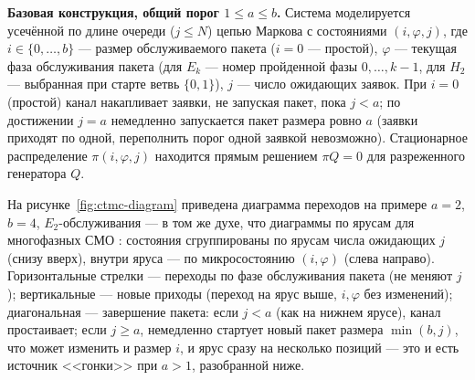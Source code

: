 \documentclass[12pt,a4paper]{article}
\newcommand{\articlesection}[1]{\par\vspace{14pt}{\bfseries #1}\par\vspace{6pt}\nopagebreak}
\begin{document}
\articlesection{Метод}

\noindent\textbf{Базовая конструкция, общий порог $1\le a\le b$.} Система моделируется усечённой по длине очереди ($j\le N$) цепью Маркова с состояниями $(i,\varphi,j)$, где $i\in\{0,\dots,b\}$ --- размер обслуживаемого пакета ($i=0$ --- простой), $\varphi$ --- текущая фаза обслуживания пакета (для $E_k$ --- номер пройденной фазы $0,\dots,k-1$, для $H_2$ --- выбранная при старте ветвь $\{0,1\}$), $j$ --- число ожидающих заявок. При $i=0$ (простой) канал накапливает заявки, не запуская пакет, пока $j<a$; по достижении $j=a$ немедленно запускается пакет размера ровно $a$ (заявки приходят по одной, переполнить порог одной заявкой невозможно). Стационарное распределение $\pi(i,\varphi,j)$ находится прямым решением $\pi Q=0$ для разреженного генератора $Q$.

На рисунке~\ref{fig:ctmc-diagram} приведена диаграмма переходов на примере $a=2$, $b=4$, $E_2$-обслуживания --- в том же духе, что диаграммы по ярусам для многофазных СМО \cite{ryzhikov2018}: состояния сгруппированы по ярусам числа ожидающих $j$ (снизу вверх), внутри яруса --- по микросостоянию $(i,\varphi)$ (слева направо). Горизонтальные стрелки --- переходы по фазе обслуживания пакета (не меняют $j$); вертикальные --- новые приходы (переход на ярус выше, $i,\varphi$ без изменений); диагональная --- завершение пакета: если $j<a$ (как на нижнем ярусе), канал простаивает; если $j\ge a$, немедленно стартует новый пакет размера $\min(b,j)$, что может изменить и размер $i$, и ярус сразу на несколько позиций --- это и есть источник <<гонки>> при $a>1$, разобранной ниже.
\end{document}
